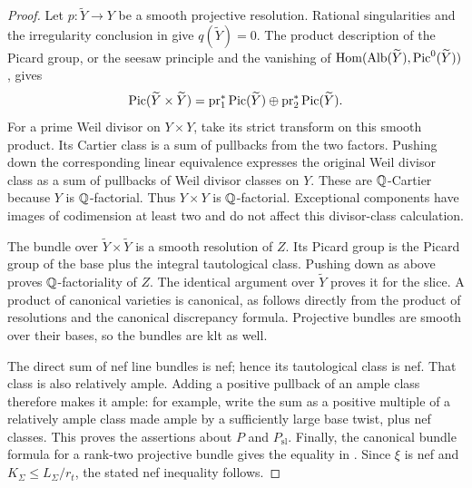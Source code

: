 \begin{proof}
Let \(p:\widetilde Y\to Y\) be a smooth projective resolution.
Rational singularities and the irregularity conclusion in
 give
\(q(\widetilde Y)=0\). The product description of the Picard group,
or the seesaw principle and the vanishing of
\(\operatorname{Hom}(\operatorname{Alb}(\widetilde Y),\operatorname{Pic}^0(\widetilde Y))\), gives
\[
 \operatorname{Pic}(\widetilde Y\times\widetilde Y)
 =\operatorname{pr}_1^*\operatorname{Pic}(\widetilde Y)
  \oplus\operatorname{pr}_2^*\operatorname{Pic}(\widetilde Y).
\]
For a prime Weil divisor on \(Y\times Y\), take its strict transform
on this smooth product. Its Cartier class is a sum of pullbacks from
the two factors. Pushing down the corresponding linear equivalence
expresses the original Weil divisor class as a sum of pullbacks of
Weil divisor classes on \(Y\). These are \(\mathbb Q\)-Cartier because
\(Y\) is \(\mathbb Q\)-factorial. Thus \(Y\times Y\) is \(\mathbb Q\)-factorial.
Exceptional components have images of codimension at least two and
do not affect this divisor-class calculation.

The bundle over \(\widetilde Y\times\widetilde Y\) is a smooth
resolution of \(Z\). Its Picard group is the Picard group of the base
plus the integral tautological class. Pushing down as above proves
\(\mathbb Q\)-factoriality of \(Z\). The identical argument over
\(\widetilde Y\) proves it for the slice. A product of canonical
varieties is canonical, as follows directly from the product of
resolutions and the canonical discrepancy formula. Projective
bundles are smooth over their bases, so the bundles are klt as well.

The direct sum of nef line bundles is nef; hence its tautological
class is nef. That class is also relatively ample. Adding a positive
pullback of an ample class therefore makes it ample: for example,
write the sum as a positive multiple of a relatively ample class
made ample by a sufficiently large base twist, plus nef classes.
This proves the assertions about \(P\) and \(P_{\mathrm{sl}}\).
Finally, the canonical bundle formula for a rank-two projective
bundle gives the equality in .
Since \(\xi\) is nef and \(K_\Sigma\le L_\Sigma/r_t\), the stated
nef inequality follows.
\end{proof}


